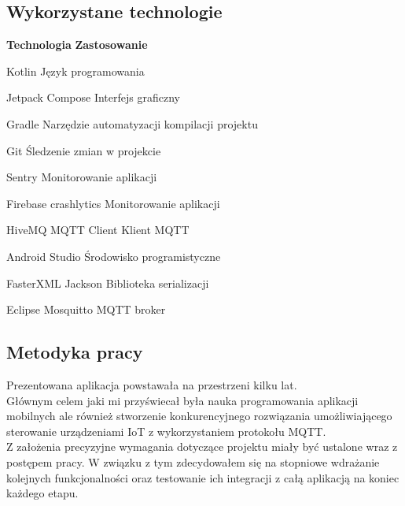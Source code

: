 \newpage

\subsection{Wykorzystane technologie}

 {
    \tabeladwiekolumnywiersz
    {\textbf{Technologia}}
    {\textbf{Zastosowanie}}

    \tabeladwiekolumnywiersz
    {Kotlin \cite{kotlindocs}}
    {Język programowania}

    \tabeladwiekolumnywiersz
    {Jetpack Compose \cite{jetpackdocs}}
    {Interfejs graficzny}

    \tabeladwiekolumnywiersz
    {Gradle \cite{gradledocs}}
    {Narzędzie automatyzacji kompilacji projektu}

    \tabeladwiekolumnywiersz
    {Git \cite{gitdocs}}
    {Śledzenie zmian w projekcie}

    \tabeladwiekolumnywiersz
    {Sentry \cite{sentrydocs}}
    {Monitorowanie aplikacji}

    \tabeladwiekolumnywiersz
    {Firebase crashlytics \cite{getstartedfirebase}}
    {Monitorowanie aplikacji}

    \tabeladwiekolumnywiersz
    {HiveMQ MQTT Client \cite{hivemqdocs}}
    {Klient MQTT}

    \tabeladwiekolumnywiersz
    {Android Studio \cite{androidstudio}}
    {Środowisko programistyczne}

    \tabeladwiekolumnywiersz
    {FasterXML Jackson \cite{fasterxmldocs}}
    {Biblioteka serializacji}

    \tabeladwiekolumnywiersz
    {Eclipse Mosquitto \cite{mosquittodocs}}
    {MQTT broker}

}

\newpage

\subsection{Metodyka pracy}

Prezentowana aplikacja powstawała na przestrzeni kilku lat.\\

Głównym celem jaki mi przyświecał była nauka programowania aplikacji mobilnych ale również stworzenie konkurencyjnego rozwiązania umożliwiającego sterowanie urządzeniami IoT z wykorzystaniem protokołu MQTT.\\

Z założenia precyzyjne wymagania dotyczące projektu miały być ustalone wraz z postępem pracy.
W związku z tym zdecydowałem się na stopniowe wdrażanie kolejnych funkcjonalności oraz testowanie ich integracji z całą aplikacją na koniec każdego etapu.\\

